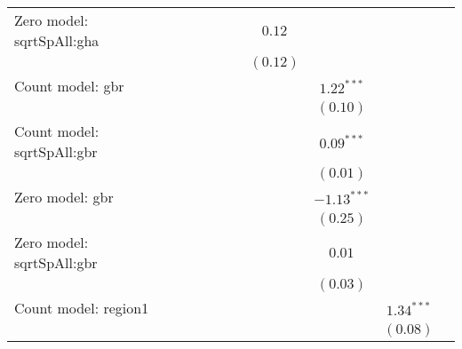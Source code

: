 \begin{table}
\begin{center}
{\begin{tabular}{l c c c c c c c c c}
Zero model: sqrtSpAll:gha      &               &               &               &               &                 & $0.12$          &               &                &               \\
                               &               &               &               &               &                 & $(0.12)$        &               &                &               \\
Count model: gbr               &               &               &               &               &                 &                 & $1.22^{***}$  &                &               \\
                               &               &               &               &               &                 &                 & $(0.10)$      &                &               \\
Count model: sqrtSpAll:gbr     &               &               &               &               &                 &                 & $0.09^{***}$  &                &               \\
                               &               &               &               &               &                 &                 & $(0.01)$      &                &               \\
Zero model: gbr                &               &               &               &               &                 &                 & $-1.13^{***}$ &                &               \\
                               &               &               &               &               &                 &                 & $(0.25)$      &                &               \\
Zero model: sqrtSpAll:gbr      &               &               &               &               &                 &                 & $0.01$        &                &               \\
                               &               &               &               &               &                 &                 & $(0.03)$      &                &               \\
Count model: region1           &               &               &               &               &                 &                 &               & $1.34^{***}$   &               \\
                               &               &               &               &               &                 &                 &               & $(0.08)$       &               \\

\end{tabular}}
\end{center}
\end{table}
